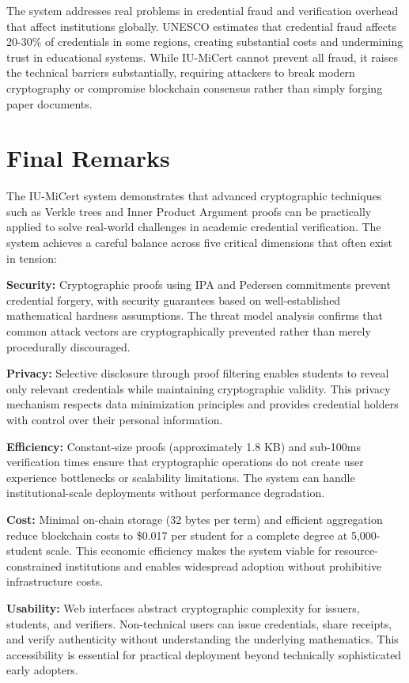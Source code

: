The system addresses real problems in credential fraud and verification overhead that affect institutions globally. UNESCO estimates that credential fraud affects 20-30\% of credentials in some regions, creating substantial costs and undermining trust in educational systems. While IU-MiCert cannot prevent all fraud, it raises the technical barriers substantially, requiring attackers to break modern cryptography or compromise blockchain consensus rather than simply forging paper documents.

\section{Final Remarks}
\label{sec:final-remarks}

The IU-MiCert system demonstrates that advanced cryptographic techniques such as Verkle trees and Inner Product Argument proofs can be practically applied to solve real-world challenges in academic credential verification. The system achieves a careful balance across five critical dimensions that often exist in tension:

\textbf{Security:} Cryptographic proofs using IPA and Pedersen commitments prevent credential forgery, with security guarantees based on well-established mathematical hardness assumptions. The threat model analysis confirms that common attack vectors are cryptographically prevented rather than merely procedurally discouraged.

\textbf{Privacy:} Selective disclosure through proof filtering enables students to reveal only relevant credentials while maintaining cryptographic validity. This privacy mechanism respects data minimization principles and provides credential holders with control over their personal information.

\textbf{Efficiency:} Constant-size proofs (approximately 1.8 KB) and sub-100ms verification times ensure that cryptographic operations do not create user experience bottlenecks or scalability limitations. The system can handle institutional-scale deployments without performance degradation.

\textbf{Cost:} Minimal on-chain storage (32 bytes per term) and efficient aggregation reduce blockchain costs to \$0.017 per student for a complete degree at 5,000-student scale. This economic efficiency makes the system viable for resource-constrained institutions and enables widespread adoption without prohibitive infrastructure costs.

\textbf{Usability:} Web interfaces abstract cryptographic complexity for issuers, students, and verifiers. Non-technical users can issue credentials, share receipts, and verify authenticity without understanding the underlying mathematics. This accessibility is essential for practical deployment beyond technically sophisticated early adopters.

